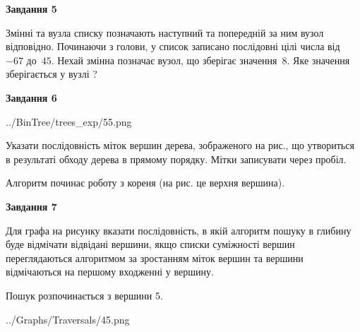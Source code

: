 \documentclass[12pt, ukrainian]{article}
\begin{document}
{\begin {large}
{\begin {center}\textbf{Завдання 5}\end {center}}\par
Змінні  та  вузла списку позначають наступний та попередній за ним вузол відповідно. Починаючи з голови, у список записано послідовні цілі числа від~$-67$ до~$45$. Нехай змінна  позначає вузол, що зберігає значення~$8$.
Яке значення зберігається у вузлі  ?\par
\newpage

{\begin {center}\textbf{Завдання 6}\end {center}}\par

\begin{center}
	{../BinTree/trees_exp/55.png}
\end{center}
Указати послідовність міток вершин дерева, зображеного на рис., що утвориться в результаті обходу дерева в прямому порядку. Мітки записувати через пробіл.\par Алгоритм починає роботу з кореня (на рис. це верхня вершина).\par
\newpage

{\begin {center}\textbf{Завдання 7}\end {center}}\par
Для графа на рисунку вказати послідовність, в якій алгоритм пошуку в глибину буде відмічати відвідані вершини, якщо списки суміжності вершин переглядаються алгоритмом за зростанням міток вершин та вершини відмічаються на першому вход\-женні у вершину.\par
Пошук розпочинається з вершини 5.\par

\begin{center}
	{../Graphs/Traversals/45.png}
\end{center}\par
\newpage


\end{large}}
\end{document}

